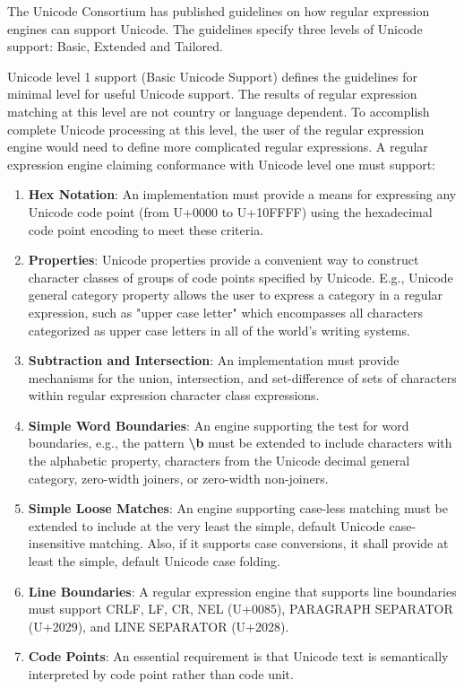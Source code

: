 The Unicode Consortium has published guidelines \cite{unicodeguideline} on how regular expression engines can support Unicode. The guidelines specify three levels of Unicode support: Basic, Extended and Tailored.

Unicode level 1 support (Basic Unicode Support) defines the guidelines for minimal level for useful Unicode support. The results of regular expression matching at this level are not country or language dependent. To accomplish complete Unicode processing at this level, the user of the regular expression engine would need to define more complicated regular expressions. A regular expression engine claiming conformance with Unicode level one must support:

\begin{enumerate}
    \item \textbf{Hex Notation}: An implementation must provide a means for expressing any Unicode code point (from U+0000 to U+10FFFF) using the hexadecimal code point encoding to meet these criteria.
    \item \textbf{Properties}: Unicode properties provide a convenient way to construct character classes of groups of code points specified by Unicode. E.g., Unicode general category property allows the user to express a category in a regular expression, such as "upper case letter" which encompasses all characters categorized as upper case letters in all of the world's writing systems.
    \item \textbf{Subtraction and Intersection}: An implementation must provide mechanisms for the union, intersection, and set-difference of sets of characters within regular expression character class expressions.
    \item \textbf{Simple Word Boundaries}: An engine supporting the test for word boundaries, e.g., the pattern \textbf{\textbackslash b} must be extended to include characters with the alphabetic property, characters from the Unicode decimal general category, zero-width joiners, or zero-width non-joiners.
    \item \textbf{Simple Loose Matches}: An engine supporting case-less matching must be extended to include at the very least the simple, default Unicode case-insensitive matching. Also, if it supports case conversions, it shall provide at least the simple, default Unicode case folding.
    \item \textbf{Line Boundaries}: A regular expression engine that supports line boundaries must support CRLF, LF, CR, NEL (U+0085), PARAGRAPH SEPARATOR (U+2029), and LINE SEPARATOR (U+2028).
    \item \textbf{Code Points}: An essential requirement is that Unicode text is semantically interpreted by code point rather than code unit.
\end{enumerate}

